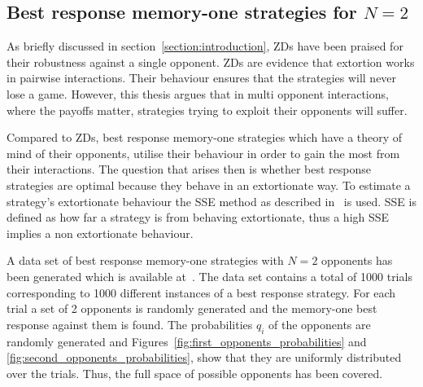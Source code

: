 \subsection{Best response memory-one strategies for \(N=2\)}\label{subsection:best_response_n_2}

As briefly discussed in section~\ref{section:introduction}, ZDs
have been praised for their robustness against a single opponent.
ZDs are evidence that extortion works in pairwise interactions.
Their behaviour ensures that the strategies will
never lose a game. However, this thesis
argues that in multi opponent interactions, where the payoffs matter, strategies
trying to exploit their opponents will suffer.

Compared to ZDs, best response memory-one strategies which
have a theory of mind of their opponents, utilise their behaviour in order to
gain the most from their interactions. The question that arises then is whether
best response strategies are optimal because they behave in an extortionate
way. To estimate a strategy's extortionate
behaviour the SSE method as described in~\cite{Knight2019} is used. SSE is
defined as how far a strategy is from behaving extortionate, thus a high
SSE implies a non extortionate behaviour.

A data set of best response memory-one strategies with \(N=2\) opponents has been
generated which is available at~\cite{glynatsi2019}. The data set contains a total of 1000 trials
corresponding to 1000 different instances of a best response strategy. For each
trial a set of 2 opponents is randomly generated and the memory-one best response
against them is found. The probabilities \(q_i\) of the opponents are
randomly generated and Figures~\ref{fig:first_opponents_probabilities} and
\ref{fig:second_opponents_probabilities}, show that they are uniformly
distributed over the trials. Thus, the full space of possible opponents has been
covered.

